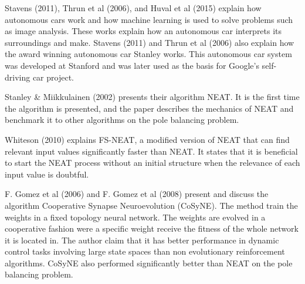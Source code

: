 Stavens (2011), Thrun et al (2006), and Huval et al (2015) explain how autonomous cars work and how machine learning is used to solve problems such as image analysis. These works explain how an autonomous car interprets its surroundings and make. Stavens (2011) and Thrun et al (2006) also explain how the award winning autonomous car Stanley works. This autonomous car system was developed at Stanford and was later used as the basis for Google's self-driving car project.

Stanley \& Miikkulainen (2002) presents their algorithm NEAT. It is the first time the algorithm is presented, and the paper describes the mechanics of NEAT and benchmark it to other algorithms on the pole balancing problem. 

Whiteson (2010) explains FS-NEAT, a modified version of NEAT that can find relevant input values significantly faster than NEAT. It states that it is beneficial to start the NEAT process without an initial structure when the relevance of each input value is doubtful.

F. Gomez et al (2006) and F. Gomez et al (2008) present and discuss the algorithm Cooperative Synapse Neuroevolution (CoSyNE). The method train the weights in a fixed topology neural network. The weights are evolved in a cooperative fashion were a specific weight receive the fitness of the whole network it is located in. The author claim that it has better performance in dynamic control tasks involving large state spaces than non evolutionary reinforcement algorithms. CoSyNE also performed significantly better than NEAT on the pole balancing problem.





